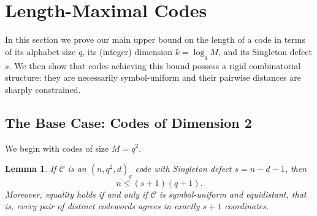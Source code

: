 \documentclass[12pt, letterpaper]{article}
\theoremstyle{plain}
\newtheorem{lemma}[theorem]{Lemma}
\theoremstyle{definition}
\begin{document}
	\section{Length-Maximal Codes}
	\label{sec:maximal_arc_bound}
	
	In this section we prove our main upper bound on the length of a code in terms of its alphabet size $q$, its (integer) dimension $k = \log_q M$, and its Singleton defect $s$. We then show that codes achieving this bound possess a rigid combinatorial structure: they are necessarily symbol-uniform and 	their pairwise distances are sharply constrained.
	
	\subsection{The Base Case: Codes of Dimension 2}
	\label{sec:base_case}
	
	We begin with codes of size $M = q^2$.
	
	\begin{lemma}\label{lem:2d_bound}
		If $\mathcal{C}$ is an $(n, q^2, d)_q$ code with Singleton defect 	$s = n - d - 1$, then
		\[
		n \le (s+1)(q+1).
		\]
		Moreover, equality holds if and only if $\mathcal{C}$ is symbol-uniform and equidistant, that is, every pair of distinct codewords agrees in
		exactly $s+1$ coordinates.
	\end{lemma}
	
\end{document}
